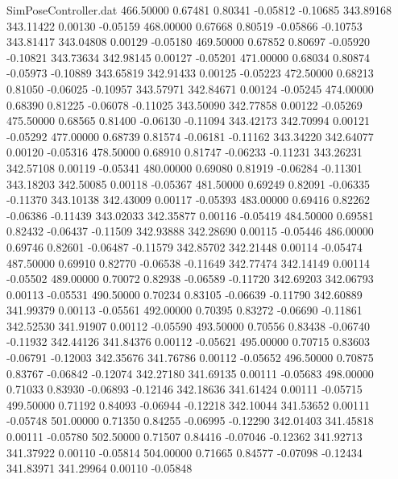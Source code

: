 \begin{filecontents}{SimPoseController.dat}
 466.50000    0.67481    0.80341    -0.05812   -0.10685  343.89168  343.11422    0.00130   -0.05159
 468.00000    0.67668    0.80519    -0.05866   -0.10753  343.81417  343.04808    0.00129   -0.05180
 469.50000    0.67852    0.80697    -0.05920   -0.10821  343.73634  342.98145    0.00127   -0.05201
 471.00000    0.68034    0.80874    -0.05973   -0.10889  343.65819  342.91433    0.00125   -0.05223
 472.50000    0.68213    0.81050    -0.06025   -0.10957  343.57971  342.84671    0.00124   -0.05245
 474.00000    0.68390    0.81225    -0.06078   -0.11025  343.50090  342.77858    0.00122   -0.05269
 475.50000    0.68565    0.81400    -0.06130   -0.11094  343.42173  342.70994    0.00121   -0.05292
 477.00000    0.68739    0.81574    -0.06181   -0.11162  343.34220  342.64077    0.00120   -0.05316
 478.50000    0.68910    0.81747    -0.06233   -0.11231  343.26231  342.57108    0.00119   -0.05341
 480.00000    0.69080    0.81919    -0.06284   -0.11301  343.18203  342.50085    0.00118   -0.05367
 481.50000    0.69249    0.82091    -0.06335   -0.11370  343.10138  342.43009    0.00117   -0.05393
 483.00000    0.69416    0.82262    -0.06386   -0.11439  343.02033  342.35877    0.00116   -0.05419
 484.50000    0.69581    0.82432    -0.06437   -0.11509  342.93888  342.28690    0.00115   -0.05446
 486.00000    0.69746    0.82601    -0.06487   -0.11579  342.85702  342.21448    0.00114   -0.05474
 487.50000    0.69910    0.82770    -0.06538   -0.11649  342.77474  342.14149    0.00114   -0.05502
 489.00000    0.70072    0.82938    -0.06589   -0.11720  342.69203  342.06793    0.00113   -0.05531
 490.50000    0.70234    0.83105    -0.06639   -0.11790  342.60889  341.99379    0.00113   -0.05561
 492.00000    0.70395    0.83272    -0.06690   -0.11861  342.52530  341.91907    0.00112   -0.05590
 493.50000    0.70556    0.83438    -0.06740   -0.11932  342.44126  341.84376    0.00112   -0.05621
 495.00000    0.70715    0.83603    -0.06791   -0.12003  342.35676  341.76786    0.00112   -0.05652
 496.50000    0.70875    0.83767    -0.06842   -0.12074  342.27180  341.69135    0.00111   -0.05683
 498.00000    0.71033    0.83930    -0.06893   -0.12146  342.18636  341.61424    0.00111   -0.05715
 499.50000    0.71192    0.84093    -0.06944   -0.12218  342.10044  341.53652    0.00111   -0.05748
 501.00000    0.71350    0.84255    -0.06995   -0.12290  342.01403  341.45818    0.00111   -0.05780
 502.50000    0.71507    0.84416    -0.07046   -0.12362  341.92713  341.37922    0.00110   -0.05814
 504.00000    0.71665    0.84577    -0.07098   -0.12434  341.83971  341.29964    0.00110   -0.05848

\end{filecontents}
